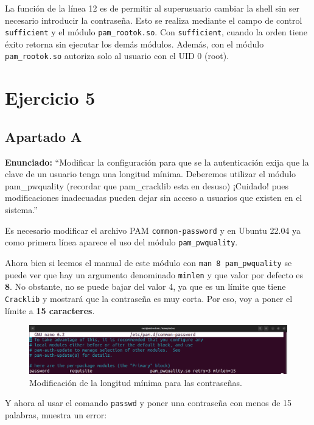 \documentclass{article}
\begin{document}
La función de la línea 12 es de permitir al superusuario cambiar la shell sin ser necesario introducir la contraseña. Esto se realiza mediante el campo de control \verb|sufficient| y el módulo \verb|pam_rootok.so|. Con \verb|sufficient|, cuando la orden tiene éxito retorna sin ejecutar los demás módulos. Además, con el módulo \verb|pam_rootok.so| autoriza solo al usuario con el UID 0 (root).


\newpage

\section{Ejercicio 5}
\subsection{Apartado A}

\textbf{Enunciado: }``Modificar la configuración para que se la autenticación exija que la clave de un usuario tenga una longitud mínima. Deberemos utilizar el módulo pam\_pwquality (recordar que pam\_cracklib esta en desuso) ¡Cuidado! pues modificaciones inadecuadas pueden dejar sin acceso a usuarios que existen en el sistema.''

\bigskip

Es necesario modificar el archivo PAM \verb|common-password| y en Ubuntu 22.04 ya como primera línea aparece el uso del módulo \verb|pam_pwquality|. 

Ahora bien si leemos el manual de este módulo con \verb|man 8 pam_pwquality| se puede ver que hay un argumento denominado \verb|minlen| y que valor por defecto es \textbf{8}. No obstante, no se puede bajar del valor 4, ya que es un límite que tiene \verb|Cracklib| y mostrará que la contraseña es muy corta. Por eso, voy a poner el límite a \textbf{15 caracteres}.

\begin{figure}[H]
    \includegraphics[width=\textwidth]{imagenes/passwordminlen15.png}
    \caption{Modificación de la longitud mínima para las contraseñas.}
\end{figure}

\bigskip

Y ahora al usar el comando \verb|passwd| y poner una contraseña con menos de 15 palabras, muestra un error:
\end{document}
